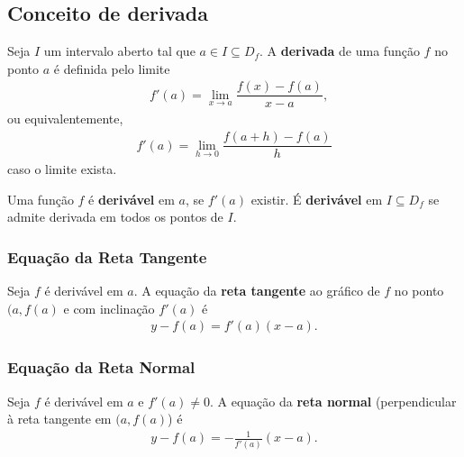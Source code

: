 \subsection*{Conceito de derivada}
\begin{tcolorbox}
\begin{defi}
Seja $I$ um intervalo aberto tal que $a\in I \subseteq D_f $. A \textbf{derivada} de uma função $f$ no ponto \textbf{$a$} é definida pelo limite
\begin{align*}
    &f'(a)=\lim\limits_{x\to a}\dfrac{f(x)-f(a)}{x-a},
\end{align*}
ou equivalentemente,
\begin{align*}
  f'(a)=\lim\limits_{h\to 0}\dfrac{f(a+h)-f(a)}{h}
\end{align*}
caso o limite exista.
\end{defi}
\begin{defi}
Uma função $f$ é \textbf{derivável} em $a$, se $f'(a)$ existir. É  \textbf{derivável} em $I\subseteq D_f$ se admite derivada em todos os pontos de $I$. 
\end{defi}
\subsubsection*{Equação da Reta Tangente}
Seja $f$ é derivável em $a$. A equação da \textbf{reta tangente} ao gráfico de $f$ no ponto $(a, f(a)$ e com inclinação $f'(a)$ é
\begin{align*}
    y-f(a)=f'(a)(x-a).
\end{align*}
\subsubsection*{Equação da Reta Normal}
Seja $f$ é derivável em $a$ e $f'(a)\neq 0$. A equação da \textbf{reta normal} (perpendicular à reta tangente em $(a,f(a)$) é
    \begin{align*}
    y-f(a)=-\frac{1}{f'(a)}(x-a).
    \end{align*}
\end{tcolorbox}
\newpage
\begin{tcolorbox}
\begin{Figure}
    \centering
    
\end{Figure}
\end{tcolorbox}

